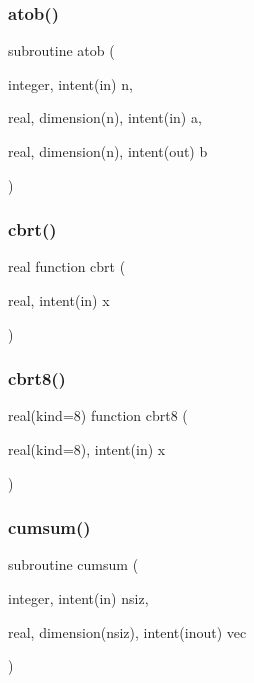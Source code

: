 \subsubsection{\texorpdfstring{atob()}{atob()}}
{\footnotesize\ttfamily subroutine atob (\begin{DoxyParamCaption}\item[{integer, intent(in)}]{n,  }\item[{real, dimension(n), intent(in)}]{a,  }\item[{real, dimension(n), intent(out)}]{b }\end{DoxyParamCaption})}

\mbox{\label{numutils_8f90_abee471b10b1564285b25aa1b7b6f1577}} 
\subsubsection{\texorpdfstring{cbrt()}{cbrt()}}
{\footnotesize\ttfamily real function cbrt (\begin{DoxyParamCaption}\item[{real, intent(in)}]{x }\end{DoxyParamCaption})}

\mbox{\label{numutils_8f90_ad4b910be4531c088be1d1e83197aa36e}} 
\subsubsection{\texorpdfstring{cbrt8()}{cbrt8()}}
{\footnotesize\ttfamily real(kind=8) function cbrt8 (\begin{DoxyParamCaption}\item[{real(kind=8), intent(in)}]{x }\end{DoxyParamCaption})}

\mbox{\label{numutils_8f90_a4c6620f6e7e0c517c0680ce839de1a3e}} 
\subsubsection{\texorpdfstring{cumsum()}{cumsum()}}
{\footnotesize\ttfamily subroutine cumsum (\begin{DoxyParamCaption}\item[{integer, intent(in)}]{nsiz,  }\item[{real, dimension(nsiz), intent(inout)}]{vec }\end{DoxyParamCaption})}

